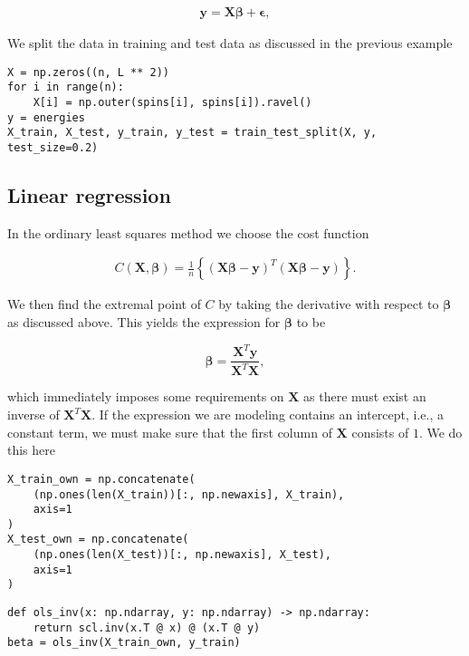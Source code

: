 \documentclass[%
oneside,                 %
final,                   %
10pt]{article}
\begin{document}
\begin{align}
    \bm{y} = \bm{X}\bm{\beta} + \bm{\epsilon},
\end{align}

We split the data in training and test data as discussed in the previous example

\begin{verbatim}
X = np.zeros((n, L ** 2))
for i in range(n):
    X[i] = np.outer(spins[i], spins[i]).ravel()
y = energies
X_train, X_test, y_train, y_test = train_test_split(X, y, test_size=0.2)
\end{verbatim}

\subsection*{Linear regression}

In the ordinary least squares method we choose the cost function

\begin{align}
    C(\bm{X}, \bm{\beta})= \frac{1}{n}\left\{(\bm{X}\bm{\beta} - \bm{y})^T(\bm{X}\bm{\beta} - \bm{y})\right\}.
\end{align}

We then find the extremal point of $C$ by taking the derivative with respect to $\bm{\beta}$ as discussed above.
This yields the expression for $\bm{\beta}$ to be

\[
    \bm{\beta} = \frac{\bm{X}^T \bm{y}}{\bm{X}^T \bm{X}},
\]

which immediately imposes some requirements on $\bm{X}$ as there must exist
an inverse of $\bm{X}^T \bm{X}$. If the expression we are modeling contains an
intercept, i.e., a constant term, we must make sure that the
first column of $\bm{X}$ consists of $1$. We do this here

\begin{verbatim}
X_train_own = np.concatenate(
    (np.ones(len(X_train))[:, np.newaxis], X_train),
    axis=1
)
X_test_own = np.concatenate(
    (np.ones(len(X_test))[:, np.newaxis], X_test),
    axis=1
)
\end{verbatim}

\begin{verbatim}
def ols_inv(x: np.ndarray, y: np.ndarray) -> np.ndarray:
    return scl.inv(x.T @ x) @ (x.T @ y)
beta = ols_inv(X_train_own, y_train)
\end{verbatim}
\end{document}
